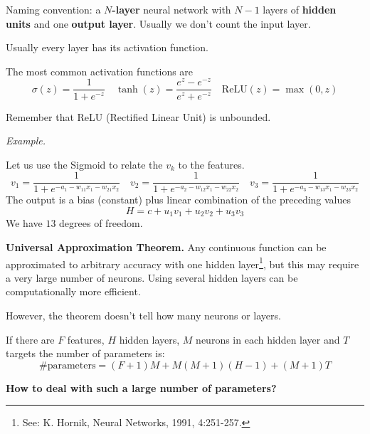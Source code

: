 Naming convention: a $N$\textbf{-layer} neural network with $N-1$ layers of \textbf{hidden units} and one \textbf{output layer}. Usually we don't count the input layer.

Usually every layer has its activation function.


The most common activation functions are
\begin{equation*}
    \sigma (z) =\frac{1}{1+e^{-z}} \quad \tanh(z) =\frac{e^{z} -e^{-z}}{e^{z} +e^{-z}} \quad \text{ReLU}(z) =\max(0,z)
\end{equation*}


Remember that ReLU (Rectified Linear Unit) is unbounded.

\textit{Example.}


Let us use the Sigmoid to relate the $v_{k}$ to the features.
\begin{equation*}
    v_{1} =\frac{1}{1+e^{-a_{1} -w_{11} x_{1} -w_{21} x_{2}}} \quad v_{2} =\frac{1}{1+e^{-a_{2} -w_{12} x_{1} -w_{22} x_{2}}} \quad v_{3} =\frac{1}{1+e^{-a_{3} -w_{13} x_{1} -w_{23} x_{2}}}
\end{equation*}
The output is a bias (constant) plus linear combination of the preceding values
\begin{equation*}
    H=c+u_{1} v_{1} +u_{2} v_{2} +u_{3} v_{3}
\end{equation*}
We have $13$ degrees of freedom.

\textbf{Universal Approximation Theorem. }Any continuous function can be approximated to arbitrary accuracy with one hidden layer\footnote{See: K. Hornik, Neural Networks, 1991, 4:251-257.}, but this may require a very large number of neurons. Using several hidden layers can be computationally more efficient.

However, the theorem doesn't tell how many neurons or layers.

If there are $F$ features, $H$ hidden layers, $M$ neurons in each hidden layer and $T$ targets the number of parameters is:
\begin{equation*}
    \text{\#parameters} =(F+1) M+M(M+1)(H-1) +(M+1) T
\end{equation*}

\textbf{How to deal with such a large number of parameters?}

